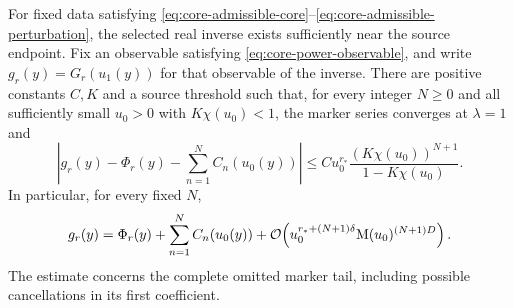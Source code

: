 \begin{theorem}
\label{thm:core-marker-majorant}
For fixed data satisfying \eqref{eq:core-admissible-core}--\eqref{eq:core-admissible-perturbation}, the selected real inverse exists sufficiently near the source endpoint. Fix an observable satisfying \eqref{eq:core-power-observable}, and write $g_r(y)=G_r(u_1(y))$ for that observable of the inverse. There are positive constants $C,K$ and a source threshold such that, for every integer $N\ge0$ and all sufficiently small $u_0>0$ with $K\chi(u_0)<1$, the marker series converges at $\lambda=1$ and
\begin{equation}
 \left|g_r(y)-\Phi_r(y)-\sum_{n=1}^{N}C_n(u_0(y))\right|
 \le C u_0^{r_*}
 \frac{(K\chi(u_0))^{N+1}}{1-K\chi(u_0)}.
 \label{eq:core-geometric-tail}
\end{equation}
In particular, for every fixed $N$,
\begin{equation}
 g_r(y)=\Phi_r(y)+\sum_{n=1}^{N}C_n(u_0(y))
 +\mathcal O\!\left(u_0^{r_*+(N+1)\delta}
                  \mathrm M(u_0)^{(N+1)D}\right).
 \label{eq:core-asymptotic-tail}
\end{equation}
The estimate concerns the complete omitted marker tail, including possible
cancellations in its first coefficient.
\end{theorem}
